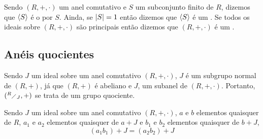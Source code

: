 \begin{Nom}
  Sendo $(R,+,\cdot)$ um anel comutativo
  e $S$ um subconjunto finito de
  $R$, dizemos que $\langle S\rangle$ é o  por
  $S$. Ainda, se $\left| S \right|=1$ então dizemos que $\langle S\rangle$ é um
  . Se todos os ideais sobre $(R,+,\cdot)$
  são principais então dizemos que $(R,+,\cdot)$ é um
  .
\end{Nom}

\subsection{Anéis quocientes}

\begin{Obs}
  Sendo $J$ um ideal sobre um anel comutativo $(R,+,\cdot)$, $J$ é um
  subgrupo normal de $(R,+)$, já que $(R,+)$ é abeliano e $J$, um
  subanel de $(R,+,\cdot)$. Portanto, $(^{R}{\scriptstyle\diagup}_{{J}},+)$ se trata de um
  grupo quociente.
\end{Obs}

\begin{Lem}\label{lema1b1Ja2b2J}
  Sendo $J$ um ideal sobre um anel comutativo $(R,+,\cdot)$, $a$ e $b$
  elementos quaisquer de $R$, $a_1$ e $a_2$ elementos
  quaisquer de $a+J$ e $b_1$ e $b_2$ elementos quaisquer de $b+J$,
  \begin{equation*}
    (a_1b_1) + J = (a_2b_2) + J
  \end{equation*}
\end{Lem}

